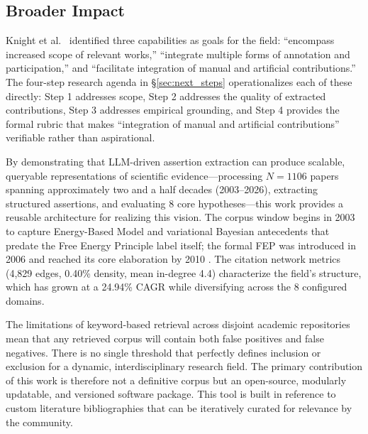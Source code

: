 \documentclass[
  english,
]{article}
\begin{document}
\subsection{Broader Impact}\label{broader-impact}

Knight et al.~\citep{knight2022fep} identified three capabilities as
goals for the field: ``encompass increased scope of relevant works,''
``integrate multiple forms of annotation and participation,'' and
``facilitate integration of manual and artificial contributions.'' The
four-step research agenda in §\ref{sec:next_steps} operationalizes each
of these directly: Step 1 addresses scope, Step 2 addresses the quality
of extracted contributions, Step 3 addresses empirical grounding, and
Step 4 provides the formal rubric that makes ``integration of manual and
artificial contributions'' verifiable rather than aspirational.

By demonstrating that LLM-driven assertion extraction can produce
scalable, queryable representations of scientific evidence---processing
\(N = 1106\) papers spanning approximately two and a half decades
(2003--2026), extracting structured assertions, and evaluating 8 core
hypotheses---this work provides a reusable architecture for realizing
this vision. The corpus window begins in 2003 to capture Energy-Based
Model and variational Bayesian antecedents that predate the Free Energy
Principle label itself; the formal FEP was introduced in 2006
\citep{friston2006free} and reached its core elaboration by 2010
\citep{friston2010free}. The citation network metrics (4,829 edges,
0.40\% density, mean in-degree 4.4) characterize the field's structure,
which has grown at a 24.94\% CAGR while diversifying across the 8
configured domains.

The limitations of keyword-based retrieval across disjoint academic
repositories mean that any retrieved corpus will contain both false
positives and false negatives. There is no single threshold that
perfectly defines inclusion or exclusion for a dynamic,
interdisciplinary research field. The primary contribution of this work
is therefore not a definitive corpus but an open-source, modularly
updatable, and versioned software package. This tool is built in
reference to custom literature bibliographies that can be iteratively
curated for relevance by the community.
\end{document}
